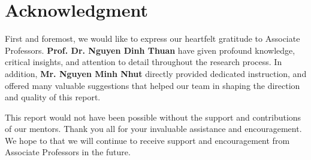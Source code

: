 \documentclass{ieeeojies}
\begin{document}
\section{Acknowledgment}
First and foremost, we would like to express our heartfelt gratitude to Associate Professors. \textbf{Prof. Dr. Nguyen Dinh Thuan} have given profound knowledge, critical insights, and attention to detail throughout the research
 process. In addition, \textbf{Mr. Nguyen Minh Nhut} directly provided dedicated instruction, and offered many valuable suggestions that helped our team in shaping the direction and quality of this report.

This report would not have been possible without the
 support and contributions of our mentors. Thank you all for your invaluable assistance and
 encouragement. We hope to that we will continue to receive support and encouragement from Associate Professors in the future.
\end{document}
